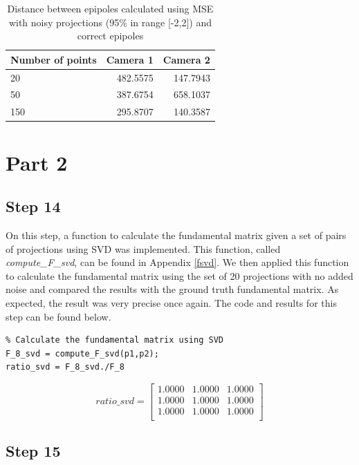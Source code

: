 \documentclass[peerreview,11pt]{IEEEtran}
\begin{document}
\begin{table}[ht]
	\caption{Distance between epipoles calculated using MSE with noisy projections (95\% in range [-2,2]) and correct epipoles}
	\centering
	\begin{tabular}{l | r r }\label{tab:ep_dist_mse_n2}
		Number of points & Camera 1 & Camera 2 \\
		\hline
		20 & 482.5575 & 147.7943 \\
		50 & 387.6754 & 658.1037 \\
		150 & 295.8707 & 140.3587 \\
	\end{tabular}
\end{table}


\newpage
\section{Part 2}\label{p2}

\subsection{Step 14}

On this step, a function to calculate the fundamental matrix given a set of pairs of projections using SVD was implemented. This function, called \textit{compute\_F\_svd}, can be found in Appendix \ref{fsvd}. We then applied this function to calculate the fundamental matrix using the set of 20 projections with no added noise and compared the results with the ground truth fundamental matrix. As expected, the result was very precise once again. The code and results for this step can be found below.

\begin{verbatim}
% Calculate the fundamental matrix using SVD
F_8_svd = compute_F_svd(p1,p2);
ratio_svd = F_8_svd./F_8
\end{verbatim}

\[
ratio\_svd = 
\begin{bmatrix}
    1.0000  &  1.0000  &  1.0000\\
    1.0000  &  1.0000  &  1.0000\\
    1.0000  &  1.0000  &  1.0000\\
\end{bmatrix}
\]



\subsection{Step 15}
\end{document}
